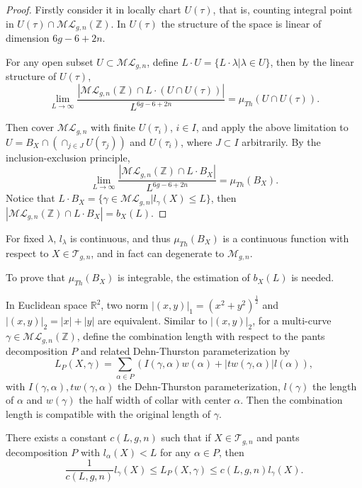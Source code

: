 \begin{proof}
Firstly consider it in locally chart $U(\tau)$, that is,  counting integral point in $U(\tau)\cap \mathscr{ML}_{g,n}(\mathbb{Z})$.  In $U(\tau)$ the structure of the space is linear of dimension $6g-6+2n$. 

For any open subset $U\subset \mathscr{ML}_{g,n}$, define $L\cdot U=\{L\cdot \lambda|\lambda\in U\}$, then by the linear structure of $U(\tau)$, 
\begin{equation}\label{muthmtau}
    \lim_{L\to \infty} \frac{|\mathscr{ML}_{g,n}(\mathbb{Z})\cap L\cdot (U\cap U(\tau))|}{L^{6g-6+2n}}=\mu_{Th}(U\cap U(\tau)).
\end{equation}



Then cover $\mathscr{ML}_{g,n}$ with finite $U(\tau_i)$, $i\in I$, and  apply the above limitation to $U=B_X\cap (\cap_{j\in J}U(\tau_j))$ and $U(\tau_i)$, where $J\subset I$ arbitrarily. By the inclusion-exclusion principle, 
$$
\lim_{L\to \infty} \frac{|\mathscr{ML}_{g,n}(\mathbb{Z})\cap L\cdot B_X|}{L^{6g-6+2n}}=\mu_{Th}(B_X).
$$
Notice that $L\cdot B_X=\{\gamma\in \mathscr{ML}_{g,n}| l_\gamma(X)\leq L\}$, then $|\mathscr{ML}_{g,n}(\mathbb{Z})\cap L\cdot B_X|=b_X(L).$
\end{proof}

\begin{remark}
For fixed $\lambda$, $l_\lambda$ is continuous, and thus $\mu_{Th}(B_X)$ is a continuous function with respect to $X\in \mathscr{T}_{g,n}$,  and in fact can degenerate to $\mathscr{M}_{g,n}$.
\end{remark}

To prove that $\mu_{Th}(B_X)$ is integrable, the estimation of $b_X(L)$ is needed. 

In Euclidean space $\mathbb{R}^2$, two norm $|(x,y)|_1=(x^2+y^2)^{\frac{1}{2}}$  and $|(x,y)|_2=|x|+|y|$ are equivalent. Similar to $|(x,y)|_2$, for a  multi-curve $\gamma\in \mathscr{ML}_{g,n}(\mathbb{Z})$, define the combination length with respect to the pants decomposition  $P$ and related  Dehn-Thurston parameterization by 
$$
L_P(X,\gamma)=\sum_{\alpha\in P} (I(\gamma,\alpha)w(\alpha)+|tw(\gamma,\alpha)|l(\alpha)),
$$
with $I(\gamma,\alpha), tw(\gamma,\alpha)$ the Dehn-Thurston  parameterization, $l(\gamma)$ the length of $\alpha$ and $w(\gamma)$ the half width of collar with center $\alpha$.  Then the combination length is compatible with the original  length of $\gamma$.

\begin{theorem}\label{distanceequi}
There exists a constant $c(L,g,n)$ such that if   $X\in \mathscr{T}_{g,n}$  and  pants decomposition $P$ with $l_\alpha(X)<L$ for any $\alpha\in P$, then $$
\frac{1}{c(L,g,n)}l_\gamma(X)\leq L_{P}(X,\gamma)\leq c(L,g,n) l_\gamma(X).
$$
\end{theorem}

